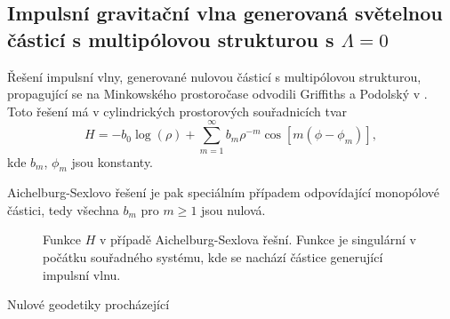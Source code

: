 \subsection{Impulsní gravitační vlna generovaná světelnou částicí s multipólovou strukturou s $\Lambda=0$}
Řešení impulsní vlny, generované nulovou částicí s multipólovou strukturou, propagující se na Minkowského prostoročase odvodili
Griffiths a Podolský v \cite{Griffiths_1997}. Toto řešení má v cylindrických prostorových souřadnicích tvar
\begin{equation}
    \label{eq:multipole_minkowski}
    H = -b_0 \log(\rho) + \sum_{m=1}^\infty b_m \rho^{-m} \cos\left[ m \left(\phi - \phi_m \right) \right],
\end{equation}
kde $b_m$, $\phi_m$ jsou konstanty.

Aichelburg-Sexlovo řešení je pak speciálním případem odpovídající monopólové částici, tedy všechna $b_m$ pro $m \geq 1$
jsou nulová. 

\begin{figure}[H]
    \centering
    \caption{Funkce $H$ v případě Aichelburg-Sexlova řešní. Funkce je singulární v počátku souřadného systému, kde se nachází částice
    generující impulsní vlnu.}
\end{figure}

Nulové geodetiky procházející 